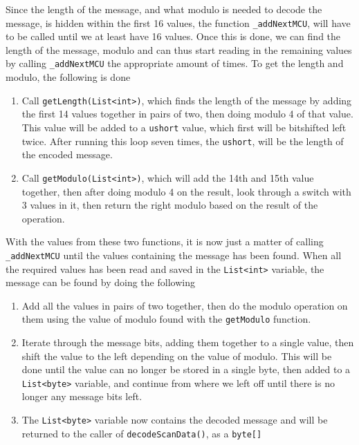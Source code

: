 Since the length of the message, and what modulo is needed to decode the message, is hidden within the first 16 values, the function \lstinline|_addNextMCU|, will have to be called until we at least have 16 values.
Once this is done, we can find the length of the message, modulo and can thus start reading in the remaining values by calling \lstinline|_addNextMCU| the appropriate amount of times.
To get the length and modulo, the following is done
\begin{enumerate}
	\item Call \lstinline|getLength(List<int>)|, which finds the length of the message by adding the first 14 values together in pairs of two, then doing modulo 4 of that value. 
	This value will be added to a \lstinline|ushort| value, which first will be bitshifted left twice. 
	After running this loop seven times, the \lstinline|ushort|, will be the length of the encoded message.
	\item Call \lstinline|getModulo(List<int>)|, which will add the 14th and 15th value together, then after doing modulo 4 on the result, look through a switch with 3 values in it, then return the right modulo based on the result of the operation.
\end{enumerate}
With the values from these two functions, it is now just a matter of calling \lstinline|_addNextMCU| until the values containing the message has been found.
When all the required values has been read and saved in the \lstinline|List<int>| variable, the message can be found by doing the following
\begin{enumerate}
	\item Add all the values in pairs of two together, then do the modulo operation on them using the value of modulo found with the \lstinline|getModulo| function.
	\item Iterate through the message bits, adding them together to a single value, then shift the value to the left depending on the value of modulo.
	This will be done until the value can no longer be stored in a single byte, then added to a \lstinline|List<byte>| variable, and continue from where we left off until there is no longer any message bits left.
	\item The \lstinline|List<byte>| variable now contains the decoded message and will be returned to the caller of \lstinline|decodeScanData()|, as a \lstinline|byte[]|
\end{enumerate}
